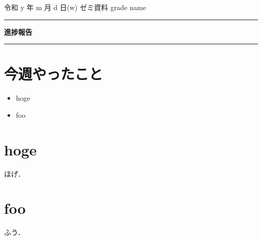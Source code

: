 \documentclass[onecolumn]{jsarticle}     %
\begin{document}


\noindent

\hspace{1em}
令和 y 年 m 月 d 日(w)
ゼミ資料
\hfill
grade name

\vspace{2mm}

\hrule

\begin{center}
{\Large \bf 進捗報告}
\end{center}


\hrule
\vspace{3mm}

\section{今週やったこと}
	\begin{itemize}
	  \item hoge \vspace{-0.5em}
 	  \item foo
	\end{itemize}


\section{hoge}
	ほげ．

\section{foo}
	ふう．
\end{document}
